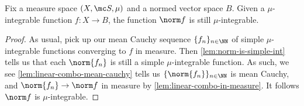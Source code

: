 \documentclass[../notes.tex]{subfiles}
\begin{document}
\begin{lemma} \label{lem:norm-int-function}
	Fix a measure space $(X,\mc S,\mu)$ and a normed vector space $B$. Given a $\mu$-integrable function $f\colon X\to B$, the function $\norm f$ is still $\mu$-integrable.
\end{lemma}
\begin{proof}
	As usual, pick up our mean Cauchy sequence $\{f_n\}_{n\in\NN}$ of simple $\mu$-integrable functions converging to $f$ in measure. Then \autoref{lem:norm-is-simple-int} tells us that each $\norm{f_n}$ is still a simple $\mu$-integrable function. As such, we see \autoref{lem:linear-combo-mean-cauchy} tells us $\{\norm{f_n}\}_{n\in\NN}$ is mean Cauchy, and $\norm{f_n}\to\norm f$ in measure by \autoref{lem:linear-combo-in-measure}. It follows $\norm f$ is $\mu$-integrable.
\end{proof}
\end{document}
